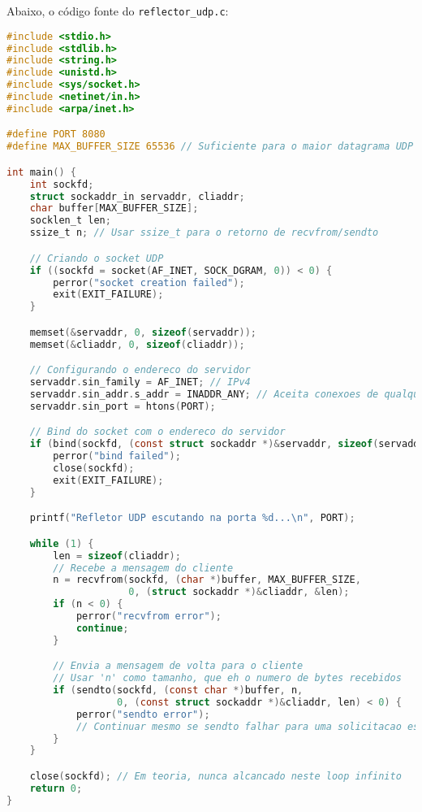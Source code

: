 Abaixo, o código fonte do \texttt{reflector\_udp.c}:
\begin{lstlisting}[language=C, caption={Código fonte do Refletor UDP (reflector\_udp.c)}, label={lst:reflector_udp}]
#include <stdio.h>
#include <stdlib.h>
#include <string.h>
#include <unistd.h>
#include <sys/socket.h>
#include <netinet/in.h>
#include <arpa/inet.h>

#define PORT 8080
#define MAX_BUFFER_SIZE 65536 // Suficiente para o maior datagrama UDP (teorico)

int main() {
    int sockfd;
    struct sockaddr_in servaddr, cliaddr;
    char buffer[MAX_BUFFER_SIZE];
    socklen_t len;
    ssize_t n; // Usar ssize_t para o retorno de recvfrom/sendto

    // Criando o socket UDP
    if ((sockfd = socket(AF_INET, SOCK_DGRAM, 0)) < 0) {
        perror("socket creation failed");
        exit(EXIT_FAILURE);
    }

    memset(&servaddr, 0, sizeof(servaddr));
    memset(&cliaddr, 0, sizeof(cliaddr));

    // Configurando o endereco do servidor
    servaddr.sin_family = AF_INET; // IPv4
    servaddr.sin_addr.s_addr = INADDR_ANY; // Aceita conexoes de qualquer IP
    servaddr.sin_port = htons(PORT);

    // Bind do socket com o endereco do servidor
    if (bind(sockfd, (const struct sockaddr *)&servaddr, sizeof(servaddr)) < 0) {
        perror("bind failed");
        close(sockfd);
        exit(EXIT_FAILURE);
    }

    printf("Refletor UDP escutando na porta %d...\n", PORT);

    while (1) {
        len = sizeof(cliaddr);
        // Recebe a mensagem do cliente
        n = recvfrom(sockfd, (char *)buffer, MAX_BUFFER_SIZE,
                     0, (struct sockaddr *)&cliaddr, &len);
        if (n < 0) {
            perror("recvfrom error");
            continue;
        }

        // Envia a mensagem de volta para o cliente
        // Usar 'n' como tamanho, que eh o numero de bytes recebidos
        if (sendto(sockfd, (const char *)buffer, n,
                   0, (const struct sockaddr *)&cliaddr, len) < 0) {
            perror("sendto error");
            // Continuar mesmo se sendto falhar para uma solicitacao especifica
        }
    }

    close(sockfd); // Em teoria, nunca alcancado neste loop infinito
    return 0;
}
\end{lstlisting}

